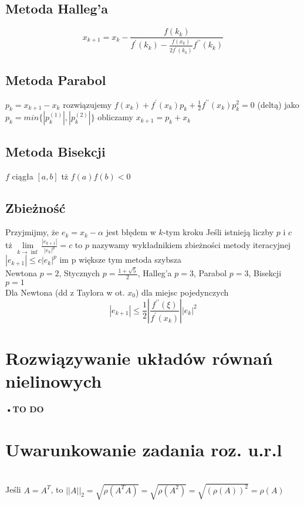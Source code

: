 \documentclass[twocolumn]{article}
\begin{document}
\begin{flushleft}
\subsection{Metoda Halleg'a}
$$x_{k+1}=x_k-\frac{f(k_{k})}{f^{\prime}(k_k)-\frac{f(x_k)}{2f^\prime(k_{k})}f^{\prime \prime}(k_{k})}$$
\subsection{Metoda Parabol}
$p_k=x_{k+1}-x_k$ rozwiązujemy $f(x_k) + f^{\prime}(x_k)p_k+\frac{1}{2}f^{\prime \prime}(x_k)p_k^2=0$ (deltą) jako $p_k=min\{|p_k^{(1)}|,|p_k^{(2)}|\}$ obliczamy $x_{k+1}=p_k+x_k$
\subsection{Metoda Bisekcji}
$f$ ciągła $[a,b]$ tż $f(a)f(b) < 0$ 
\begin{algorithmic}
	\ELSE
	\ENDIF
\ENDFOR
\end{algorithmic}
\subsection{Zbieżność}
Przyjmijmy, że $e_k=x_k - \alpha$ jest błędem w $k$-tym kroku Jeśli istnieją liczby $p$ i $c$ tż $\underset{k \to \inf}{\lim}\frac{|e_{k+1}|}{|e_k|^p}=c$ to $p$ nazywamy wykładnikiem zbieżności metody iteracyjnej\\
$|e_{k+1}| \leq c|e_k|^p$ im p większe tym metoda szybsza\\
Newtona $p=2$, Stycznych $p=\frac{1+\sqrt{5}}{2}$, Halleg'a $p=3$, Parabol $p=3$, Bisekcji $p=1$\\
Dla Newtona (dd z Taylora w ot. $x_0$) dla miejsc pojedynczych
$$|e_{k+1}|\leq \frac{1}{2}\left| \frac{f^{\prime \prime}(\xi)}{f^{\prime}(x_k)}\right| |e_k|^2$$
\section{Rozwiązywanie układów równań nielinowych}
{\Large \textbf{•TO DO}}

\section{Uwarunkowanie zadania roz. u.r.l}
\\
Jeśli $A=A^T$, to $||A||_2 = \sqrt{\rho(A^TA)}=\sqrt{\rho(A^2)} =\sqrt{(\rho(A))^2}=\rho(A)$\\
\end{flushleft}
\end{document}

